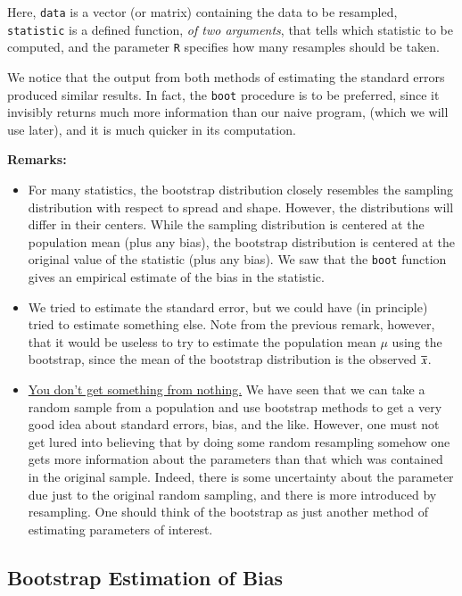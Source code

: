 \documentclass[11pt,english]{scrbook}
\begin{document}
Here, \texttt{data} is a vector (or matrix) containing the data to be resampled, \texttt{statistic} is a defined function, \emph{of two arguments}, that tells which statistic to be computed, and the parameter \texttt{R} specifies how many resamples should be taken.



We notice that the output from both methods of estimating the standard errors produced similar results. In fact, the \texttt{boot} procedure is to be preferred, since it invisibly returns much more information than our naive program, (which we will use later), and it is much quicker in its computation.  


\textbf{Remarks:}
\begin{itemize}
\item For many statistics, the bootstrap distribution closely resembles the sampling distribution with respect to spread and shape. However, the distributions will differ in their centers. While the sampling distribution is centered at the population mean (plus any bias), the bootstrap distribution is centered at the original value of the statistic (plus any bias). We saw that the \texttt{boot} function gives an empirical estimate of the bias in the statistic.

\item We tried to estimate the standard error, but we could have (in principle) tried to estimate something else. Note from the previous remark, however, that it would be useless to try to estimate the population mean \(\mu\) using the bootstrap, since the mean of the bootstrap distribution is the observed \(\overline{x}\).

\item \uline{You don't get something from nothing.} We have seen that we can take a random sample from a population and use bootstrap methods to get a very good idea about standard errors, bias, and the like. However, one must not get lured into believing that by doing some random resampling somehow one gets more information about the parameters than that which was contained in the original sample. Indeed, there is some uncertainty about the parameter due just to the original random sampling, and there is more introduced by resampling. One should think of the bootstrap as just another method of estimating parameters of interest.
\end{itemize}



\subsection{Bootstrap Estimation of Bias}
\label{sec:org8c12bce}
\end{document}
